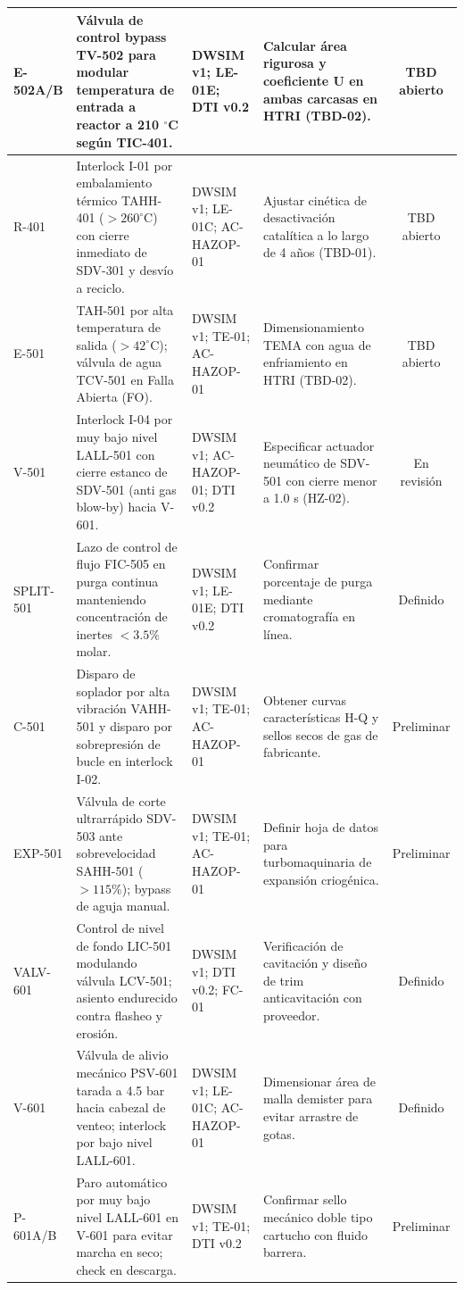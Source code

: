 \documentclass[10pt,letterpaper]{article}
\begin{document}
\begin{landscape}
\begin{xltabular}{\linewidth}{|l|p{6.0cm}|p{3.2cm}|p{4.2cm}|c|}
E-502A/B & Válvula de control bypass TV-502 para modular temperatura de entrada a reactor a 210 $^\circ$C según TIC-401. & DWSIM v1; LE-01E; DTI v0.2 & Calcular área rigurosa y coeficiente U en ambas carcasas en HTRI (TBD-02). & TBD abierto \\ \hline
R-401 & Interlock I-01 por embalamiento térmico TAHH-401 ($>260^\circ\text{C}$) con cierre inmediato de SDV-301 y desvío a reciclo. & DWSIM v1; LE-01C; AC-HAZOP-01 & Ajustar cinética de desactivación catalítica a lo largo de 4 años (TBD-01). & TBD abierto \\ \hline
E-501 & TAH-501 por alta temperatura de salida ($>42^\circ\text{C}$); válvula de agua TCV-501 en Falla Abierta (FO). & DWSIM v1; TE-01; AC-HAZOP-01 & Dimensionamiento TEMA con agua de enfriamiento en HTRI (TBD-02). & TBD abierto \\ \hline
V-501 & Interlock I-04 por muy bajo nivel LALL-501 con cierre estanco de SDV-501 (anti gas blow-by) hacia V-601. & DWSIM v1; AC-HAZOP-01; DTI v0.2 & Especificar actuador neumático de SDV-501 con cierre menor a 1.0 s (HZ-02). & En revisión \\ \hline
SPLIT-501 & Lazo de control de flujo FIC-505 en purga continua manteniendo concentración de inertes $<3.5\%$ molar. & DWSIM v1; LE-01E; DTI v0.2 & Confirmar porcentaje de purga mediante cromatografía en línea. & Definido \\ \hline
C-501 & Disparo de soplador por alta vibración VAHH-501 y disparo por sobrepresión de bucle en interlock I-02. & DWSIM v1; TE-01; AC-HAZOP-01 & Obtener curvas características H-Q y sellos secos de gas de fabricante. & Preliminar \\ \hline
EXP-501 & Válvula de corte ultrarrápido SDV-503 ante sobrevelocidad SAHH-501 ($>115\%$); bypass de aguja manual. & DWSIM v1; TE-01; AC-HAZOP-01 & Definir hoja de datos para turbomaquinaria de expansión criogénica. & Preliminar \\ \hline
VALV-601 & Control de nivel de fondo LIC-501 modulando válvula LCV-501; asiento endurecido contra flasheo y erosión. & DWSIM v1; DTI v0.2; FC-01 & Verificación de cavitación y diseño de trim anticavitación con proveedor. & Definido \\ \hline
V-601 & Válvula de alivio mecánico PSV-601 tarada a 4.5 bar hacia cabezal de venteo; interlock por bajo nivel LALL-601. & DWSIM v1; LE-01C; AC-HAZOP-01 & Dimensionar área de malla demister para evitar arrastre de gotas. & Definido \\ \hline
P-601A/B & Paro automático por muy bajo nivel LALL-601 en V-601 para evitar marcha en seco; check en descarga. & DWSIM v1; TE-01; DTI v0.2 & Confirmar sello mecánico doble tipo cartucho con fluido barrera. & Preliminar \\ \hline

\end{xltabular}
\end{landscape}
\end{document}
